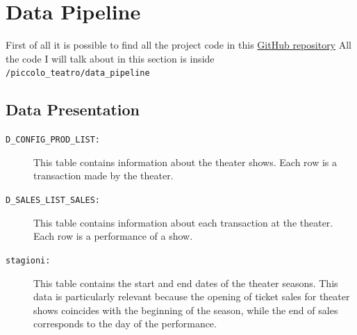 \documentclass[a4paper,12pt]{report}  %
\begin{document}
\section{Data Pipeline}
First of all it is possible to find all the project code in this \href{https://github.com/SiniscalchiCarlo/piccolo_teatro/tree/features/refactoring}{GitHub repository}
All the code I will talk about in this section is inside \verb|/piccolo_teatro/data_pipeline|
\subsection{Data Presentation}
\begin{description}
	\item[\texttt{D\_CONFIG\_PROD\_LIST:}]
	      This table contains information about the theater shows. Each row is a transaction made by the theater.
	\item[\texttt{D\_SALES\_LIST\_SALES:}]
	      This table contains information about each transaction at the theater. Each row is a performance of a show.
	\item[\texttt{stagioni:}]
	      This table contains the start and end dates of the theater seasons. This data is particularly relevant because the opening of ticket sales for theater shows coincides with the beginning of the season, while the end of sales corresponds to the day of the performance.
\end{description}
\end{document}
